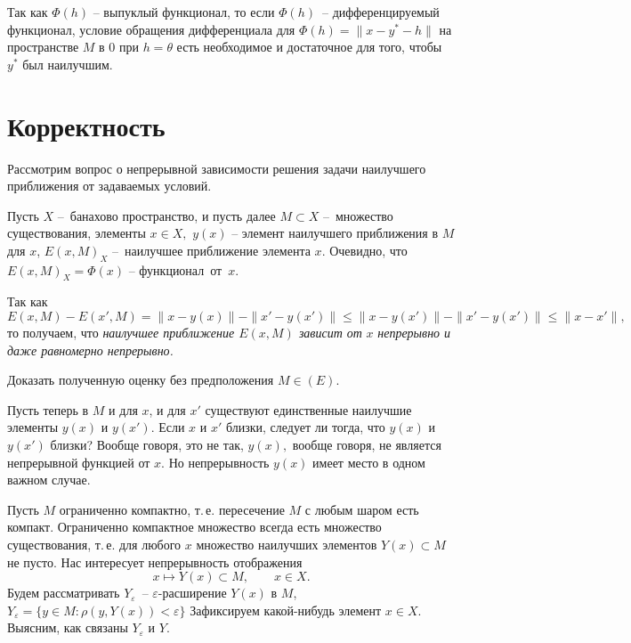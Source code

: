  Так как $\Phi(h)$ -- выпуклый функционал, то
если $\Phi(h)$~-- дифференцируемый функционал,
 условие обращения дифференциала для $\Phi(h)=\|x-y^*-h\|$ на пространстве
 $M$ в 0 при $h=\theta$ есть необходимое и достаточное для того, чтобы $y^*$
 был наилучшим.

\section{Корректность}

Рассмотрим вопрос о непрерывной зависимости решения задачи наилучшего приближения
от задаваемых условий.

 Пусть $X$ --~банахово пространство, и пусть далее $M\subset X$ --~множество
 существования, элементы $x\in X,$ $y(x)$ -- элемент
 наилучшего приближения в $M$ для $x$, $E(x,M)_X$ --~наилучшее приближение
 элемента $x.$ Очевидно, что $E(x,M)_X=\Phi(x)$ --
 функционал~от~$x.$

 Так как
 $$
 E(x,M)-E(x',M)=\|x-y(x)\|-\|x'-y(x')\|\le \|x-y(x')\|-\|x'-y(x')\|\le
 \|x-x'\|,
 $$
 то получаем, что {\it наилучшее приближение {$E(x,M)$} зависит от} $x$
 {\it {непрерывно и} {даже равномерно непрерывно.}}

\ex Доказать полученную оценку без предположения $M\in (E).$

 Пусть теперь в $M$ и для $x$, и для $x'$ существуют единственные
 наилучшие элементы $y(x)$ и $y(x').$ Если $x$ и $x'$ близки,
 следует ли тогда, что $y(x)$ и $y(x')$ близки? Вообще говоря, это не
 так, $y(x),$ вообще говоря, не является непрерывной функцией от $x.$
 Но непрерывность $y(x)$ имеет место в одном важном случае.

 Пусть $M$ ограниченно компактно, т.\,е. пересечение $M$
 с любым шаром {есть} компакт. Ограниченно компактное
 множество всегда есть множество существования, т.\,е.
 для любого $x$ множество наилучших элементов
 $Y(x)\subset M$ не пусто. {Нас интересует} {непрерывность отображения}
 $$
   x \longmapsto Y(x)\subset M,\qquad{ x \in X}.
 $$
 Будем рассматривать {$Y_{\varepsilon}$~--} $\varepsilon$-расширение $Y(x)$ в $M$,~
 {$Y_{\varepsilon}=\{y\in M:\rho(y,Y(x))<\varepsilon\}$}
 Зафиксируем какой-нибудь элемент $x\in X.$
 Выясним, как связаны $Y_{\varepsilon}$ и $Y.$


